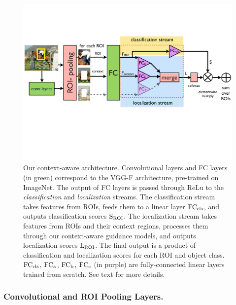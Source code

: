 \begin{figure}[t] \includegraphics[width=\textwidth, trim={1mm 7.3cm 1mm 4cm},
clip]{eccv16_figures/model} \caption[Our context-aware architecture]{Our context-aware architecture. 
Convolutional layers and FC layers (in green) correspond to the VGG-F architecture, pre-trained on ImageNet.
The output of FC layers is passed through ReLu to the {\em classification} and {\em localization} streams. 
The classification stream takes features from ROIs, feeds them to a linear layer ${\rm FC_{cls}}$, and outputs classification scores ${\rm S_{ROI}}$. The localization stream takes features from ROIs and their context regions, processes them through our context-aware guidance models, and outputs localization scores ${\rm L_{ROI}}$. The final output is a product of classification and localization scores for each ROI and object class.
${\rm FC_{cls}}$, ${\rm FC_{a}}$, ${\rm FC_{b}}$, ${\rm FC_{c}}$ (in purple) are fully-connected linear layers trained from scratch. See text for more details.
} 
\label{fig:model} 
\end{figure}


\subsubsection{Convolutional and ROI Pooling Layers.} 

